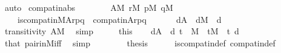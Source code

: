 \begin{isabellebody}
\ auto\isanewline
{}\isamarkupfalse%
%
\endisatagproof
{\isafoldproof}%
%
\isadelimproof
\isanewline
%
\endisadelimproof
\isanewline
\isanewline
{}\isamarkupfalse%
\ compat{\isacharunderscore}{\kern0pt}in{\isacharunderscore}{\kern0pt}abs\ {\isacharcolon}{\kern0pt}\isanewline
\ \ \isanewline
\ \ \ \ {\isachardoublequoteopen}A{\isasymin}M{\isachardoublequoteclose}\ {\isachardoublequoteopen}r{\isasymin}M{\isachardoublequoteclose}\ {\isachardoublequoteopen}p{\isasymin}M{\isachardoublequoteclose}\ {\isachardoublequoteopen}q{\isasymin}M{\isachardoublequoteclose}\ \isanewline
\ \ \isanewline
\ \ \ \ {\isachardoublequoteopen}is{\isacharunderscore}{\kern0pt}compat{\isacharunderscore}{\kern0pt}in{\isacharparenleft}{\kern0pt}{\isacharhash}{\kern0pt}{\isacharhash}{\kern0pt}M{\isacharcomma}{\kern0pt}A{\isacharcomma}{\kern0pt}r{\isacharcomma}{\kern0pt}p{\isacharcomma}{\kern0pt}q{\isacharparenright}{\kern0pt}\ {\isasymlongleftrightarrow}\ compat{\isacharunderscore}{\kern0pt}in{\isacharparenleft}{\kern0pt}A{\isacharcomma}{\kern0pt}r{\isacharcomma}{\kern0pt}p{\isacharcomma}{\kern0pt}q{\isacharparenright}{\kern0pt}{\isachardoublequoteclose}\ \isanewline
%
\isadelimproof
%
\endisadelimproof
%
\isatagproof
{}\isamarkupfalse%
\ {\isacharminus}{\kern0pt}\isanewline
\ \ \isamarkupfalse%
\ {\isachardoublequoteopen}d{\isasymin}A\ {\isasymLongrightarrow}\ d{\isasymin}M{\isachardoublequoteclose}\ \ d\isanewline
\ \ \ \ \isamarkupfalse%
\ transitivity\ {\isacartoucheopen}A{\isasymin}M{\isacartoucheclose}\ \isamarkupfalse%
\ simp\isanewline
\ \ \isamarkupfalse%
\ \isamarkupfalse%
\ this\isanewline
\ \ \isamarkupfalse%
\ {\isachardoublequoteopen}d{\isasymin}A\ {\isasymLongrightarrow}\ {\isasymlangle}d{\isacharcomma}{\kern0pt}\ t{\isasymrangle}\ {\isasymin}\ M{\isachardoublequoteclose}\ \ {\isachardoublequoteopen}t{\isasymin}M{\isachardoublequoteclose}\ \ t\ d\isanewline
\ \ \ \ \isamarkupfalse%
\ that\ pair{\isacharunderscore}{\kern0pt}in{\isacharunderscore}{\kern0pt}M{\isacharunderscore}{\kern0pt}iff\ \isamarkupfalse%
\ simp\isanewline
\ \ \isamarkupfalse%
\ \isanewline
\ \ \isamarkupfalse%
\ {\isacharquery}{\kern0pt}thesis\isanewline
\ \ \ \ \isamarkupfalse%
\ is{\isacharunderscore}{\kern0pt}compat{\isacharunderscore}{\kern0pt}in{\isacharunderscore}{\kern0pt}def\ compat{\isacharunderscore}{\kern0pt}in{\isacharunderscore}{\kern0pt}def\ \isanewline

\end{isabellebody}
